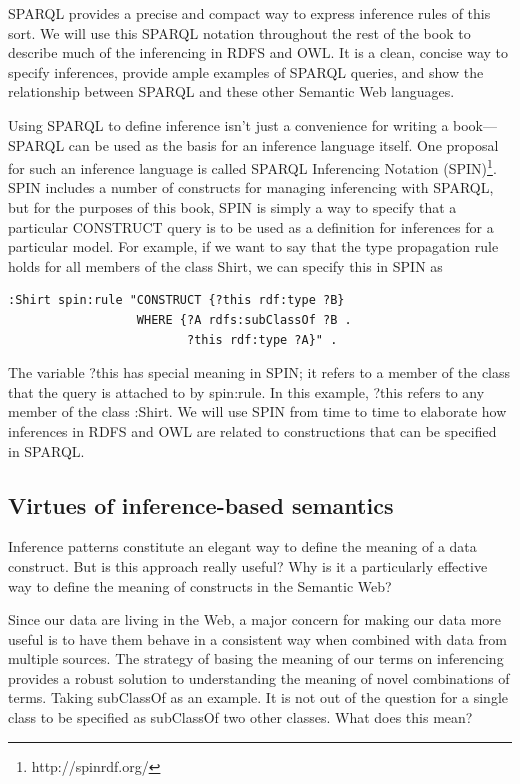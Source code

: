SPARQL provides a precise and compact way to express inference rules of
this sort. We will use this SPARQL notation throughout the rest of the
book to describe much of the inferencing in RDFS and OWL. It is a clean,
concise way to specify inferences, provide ample examples of SPARQL
queries, and show the relationship between SPARQL and these other
Semantic Web languages.

Using SPARQL to define inference isn't just a convenience for writing a
book---SPARQL can be used as the basis for an inference language itself.
One proposal for such an inference language is called SPARQL Inferencing
Notation (SPIN)\footnote{http://spinrdf.org/}. SPIN includes a number of constructs for managing
inferencing with SPARQL, but for the purposes of this book, SPIN is
simply a way to specify that a particular CONSTRUCT query is to be used
as a definition for inferences for a particular model. For example, if
we want to say that the type propagation rule holds for all members of
the class Shirt, we can specify this in SPIN as

\begin{lstlisting}
:Shirt spin:rule "CONSTRUCT {?this rdf:type ?B}
                  WHERE {?A rdfs:subClassOf ?B .
                         ?this rdf:type ?A}" .
\end{lstlisting}

The variable ?this has special meaning in SPIN; it refers to a member of
the class that the query is attached to by spin:rule. In this example,
?this refers to any member of the class :Shirt. We will use SPIN from
time to time to elaborate how inferences in RDFS and OWL are related to
constructions that can be specified in SPARQL.

\subsection{Virtues of inference-based semantics}

Inference patterns constitute an elegant way to define the meaning of a
data construct. But is this approach really useful? Why is it a
particularly effective way to define the meaning of constructs in the
Semantic Web?

Since our data are living in the Web, a major concern for making our
data more useful is to have them behave in a consistent way when
combined with data from multiple sources. The strategy of basing the
meaning of our terms on inferencing provides a robust solution to
understanding the meaning of novel combinations of terms. Taking
subClassOf as an example. It is not out of the question for a single
class to be specified as subClassOf two other classes. What does this
mean?


